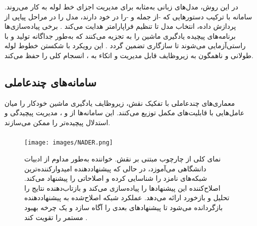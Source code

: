 \subsubsection{\protect{}}
در این روش، مدل‌های زبانی به‌مثابه  برای مدیریت اجزای خط لوله به کار می‌روند. سامانه با ترکیب دستور‌هایی که -از جمله  و -را در خود دارند، مدل را در مراحل پیاپی از پردازش داده، انتخاب مدل تا تنظیم فراپارامتر هدایت می‌کند \cite{zhang2023AutomlGPTAutomaticMachineLearning, shen2023HuggingGPT}. برخی پیاده‌سازی‌ها برنامه‌های پیچیده یادگیری ماشین را به  تجزیه می‌کنند که به‌طور جداگانه تولید و با  راستی‌آزمایی می‌شوند تا سازگاری تضمین گردد \cite{xu2024largeTextToML}. این رویکرد با شکستن خطوط لوله طولانی و ناهمگون به زیروظایف قابل مدیریت و اتکاء به ، انسجام کلی را حفظ می‌کند.
\subsection{سامانه‌های چندعاملی}

معماری‌های چندعاملی با تفکیک نقش، زیروظایف یادگیری ماشین خودکار را میان عامل‌هایی با قابلیت‌های مکمل توزیع می‌کنند. این سامانه‌ها از  و ، مدیریت پیچیدگی و استدلال پیچیده‌تر را ممکن می‌سازند.

\subsubsection{\protect{}}

\begin{figure}[h!]
    \centering
    \texttt{[image: images/NADER.png]}
    \caption[چارچوب مبتنی بر نقش]{
        نمای کلی از چارچوب مبتنی بر نقش. خواننده به‌طور مداوم از ادبیات دانشگاهی می‌آموزد، در حالی که پیشنهاددهنده امیدوارکننده‌ترین شبکه‌های نامزد را شناسایی کرده و اصلاحاتی را پیشنهاد می‌کند. اصلاح‌کننده این پیشنهادها را پیاده‌سازی می‌کند و بازتاب‌دهنده نتایج را تحلیل و بازخورد ارائه می‌دهد. عملکرد شبکه اصلاح‌شده به پیشنهاددهنده بازگردانده می‌شود تا پیشنهادهای بعدی را آگاه سازد و یک چرخه بهبود مستمر را تقویت کند \cite{Yang2025NADER}.
    }
    \label{fig:role-based-framework}
\end{figure}

